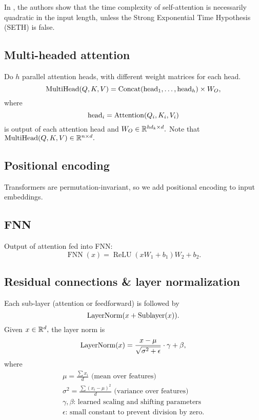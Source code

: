 \begin{remark*}
    In \cite{keles2022computationalcomplexityselfattention}, the authors show that the time complexity of self-attention is necessarily quadratic in the input length, unless the Strong Exponential Time Hypothesis (SETH) is false.
\end{remark*}

\subsection{Multi-headed attention}
Do $h$ parallel attention heads, with different weight matrices for each head.
\[ \operatorname{MultiHead}(Q, K, V) = \operatorname{Concat}(\operatorname{head}_1, \ldots, \operatorname{head}_h) \times W_O, \]
where
\[ \operatorname{head}_i = \operatorname{Attention}(Q_i, K_i, V_i) \]
is output of each attention head and $W_O \in \mathbb{R}^{hd_k \times d}.$ Note that $\operatorname{MultiHead}(Q, K, V) \in \mathbb{R}^{n \times d}.$ 

\subsection{Positional encoding}
Transformers are permutation-invariant, so we add positional encoding to input embeddings.

\subsection{FNN}
Output of attention fed into FNN:
\[ \operatorname{FNN}(x) = \operatorname{ReLU}(xW_1 + b_1)W_2 + b_2. \]

\subsection{Residual connections \& layer normalization}
Each sub-layer (attention or feedforward) is followed by
\[ \operatorname{LayerNorm}(x + \operatorname{Sublayer}(x)). \]
Given $x \in \mathbb{R}^d,$ the layer norm is 
\[ \operatorname{LayerNorm}(x) = \frac{x - \mu}{\sqrt{\sigma^2 + \epsilon}} \cdot \gamma + \beta, \]
where
\begin{gather*}
    \mu = \frac{\sum x_i}{d} \text{ (mean over features)}\\
    \sigma^2 = \frac{\sum(x_i - \mu)^2}{d} \text{ (variance over features)}\\
    \gamma,\beta \text{: learned scaling and shifting parameters}\\
    \epsilon \text{: small constant to prevent division by zero}.
\end{gather*}

